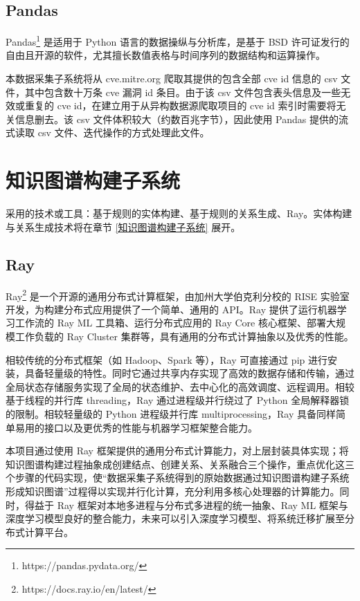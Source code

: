 \documentclass[a4paper,AutoFakeBold,oneside,12pt]{book}
\begin{document}
\subsection{Pandas}

Pandas\footnote{https://pandas.pydata.org/} 是适用于 Python 语言的数据操纵与分析库，是基于 BSD 许可证发行的自由且开源的软件，尤其擅长数值表格与时间序列的数据结构和运算操作。

本数据采集子系统将从 cve.mitre.org 爬取其提供的包含全部 cve id 信息的 csv 文件，其中包含数十万条 cve 漏洞 id 条目。由于该 csv 文件包含表头信息及一些无效或重复的 cve id，在建立用于从异构数据源爬取项目的 cve id 索引时需要将无关信息删去。该 csv 文件体积较大（约数百兆字节），因此使用 Pandas 提供的流式读取 csv 文件、迭代操作的方式处理此文件。

\section{知识图谱构建子系统}

采用的技术或工具：基于规则的实体构建、基于规则的关系生成、Ray。实体构建与关系生成技术将在章节 \ref{知识图谱构建子系统} 展开。

\subsection{Ray}

Ray\footnote{https://docs.ray.io/en/latest/} 是一个开源的通用分布式计算框架，由加州大学伯克利分校的 RISE 实验室开发，为构建分布式应用提供了一个简单、通用的 API。Ray 提供了运行机器学习工作流的 Ray ML 工具箱、运行分布式应用的 Ray Core 核心框架、部署大规模工作负载的 Ray Cluster 集群等，具有通用的分布式计算抽象以及优秀的性能。

相较传统的分布式框架（如 Hadoop、Spark 等），Ray 可直接通过 pip 进行安装，具备轻量级的特性。同时它通过共享内存实现了高效的数据存储和传输，通过全局状态存储服务实现了全局的状态维护、去中心化的高效调度、远程调用。相较基于线程的并行库  threading，Ray 通过进程级并行绕过了 Python 全局解释器锁的限制。相较轻量级的 Python 进程级并行库 multiprocessing，Ray 具备同样简单易用的接口以及更优秀的性能与机器学习框架整合能力。

本项目通过使用 Ray 框架提供的通用分布式计算能力，对上层封装具体实现；将知识图谱构建过程抽象成创建结点、创建关系、关系融合三个操作，重点优化这三个步骤的代码实现，使“数据采集子系统得到的原始数据通过知识图谱构建子系统形成知识图谱”过程得以实现并行化计算，充分利用多核心处理器的计算能力。同时，得益于 Ray 框架对本地多进程与分布式多进程的统一抽象、Ray ML 框架与深度学习模型良好的整合能力，未来可以引入深度学习模型、将系统迁移扩展至分布式计算平台。
\end{document}
